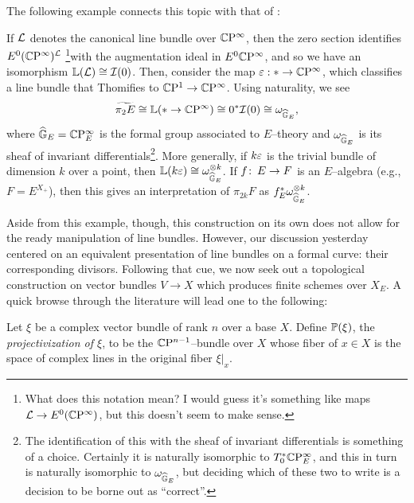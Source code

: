 The following example connects this topic with that of :
\begin{example}\label{Pi2AndInvariantDiffls}
If $\L$ denotes the canonical line bundle over $\CP^\infty$, then the zero section identifies $E^0 (\CP^\infty)^{\L}$ \footnote{What does this notation mean?  I would guess it's something like maps $\L \to E^0(\CP^\infty)$, but this doesn't seem to make sense.}with the augmentation ideal in $E^0 \CP^\infty$, and so we have an isomorphism $\ThomSheaf{\L} \cong \sheaf I(0)$.  Then, consider the map $\eps: * \to \CP^\infty$, which classifies a line bundle that Thomifies to $\CP^1 \to \CP^\infty$.  Using naturality, we see \[\widetilde{\pi_2 E} \cong \ThomSheaf{* \to \CP^\infty} \cong 0^* \sheaf I(0) \cong \omega_{\G_E},\] where $\G_E = \CP^\infty_E$ is the formal group associated to $E$--theory and $\omega_{\G_E}$ is its sheaf of invariant differentials\footnote{The identification of this with the sheaf of invariant differentials is something of a choice.  Certainly it is naturally isomorphic to $T_0^* \CP^\infty_E$, and this in turn is naturally isomorphic to $\omega_{\G_E}$, but deciding which of these two to write is a decision to be borne out as ``correct''.}.  More generally, if $k \eps$  is the trivial bundle of dimension $k$ over a point, then $\ThomSheaf{k \eps} \cong \omega_{\G_E}^{\otimes k}$.  If $f \co E \to F$ is an $E$--algebra (e.g., $F = E^{X_+}$), then this gives an interpretation of $\pi_{2k} F$ as $f_E^* \omega_{\G_E}^{\otimes k}$.
\end{example}

Aside from this example, though, this construction on its own does not allow for the ready manipulation of line bundles.  However, our discussion yesterday centered on an equivalent presentation of line bundles on a formal curve: their corresponding divisors.  Following that cue, we now seek out a topological construction on vector bundles $V \to X$ which produces finite schemes over $X_E$.  A quick browse through the literature will lead one to the following:
\begin{definition}
Let $\xi$ be a complex vector bundle of rank $n$ over a base $X$.  Define $\P(\xi)$, the \textit{projectivization of $\xi$}, to be the $\CP^{n-1}$--bundle over $X$ whose fiber of $x \in X$ is the space of complex lines in the original fiber $\xi|_x$.
\end{definition}

